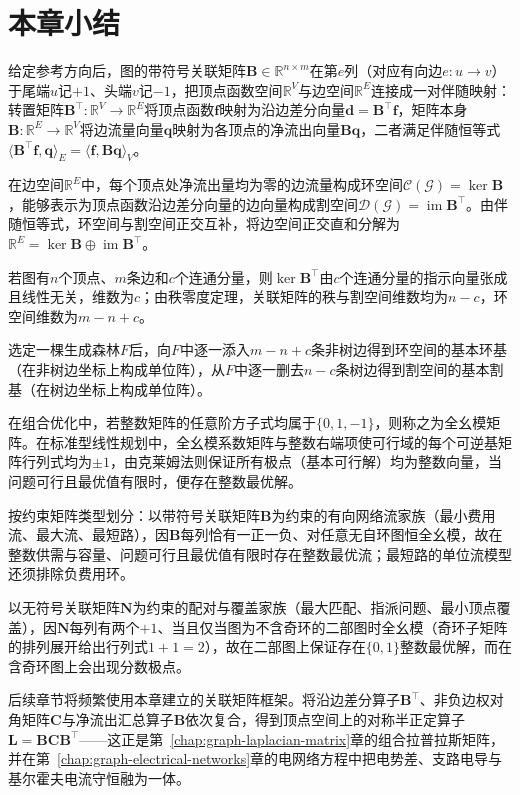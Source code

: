 \section{本章小结}
\label{sec:graph-incidence-summary}

给定参考方向后，图的带符号关联矩阵$\bm{B}\in\mathbb{R}^{n\times m}$在第$e$列（对应有向边$e\colon u\to v$）于尾端$u$记$+1$、头端$v$记$-1$，把顶点函数空间$\mathbb{R}^V$与边空间$\mathbb{R}^E$连接成一对伴随映射：转置矩阵$\bm{B}^\top\colon\mathbb{R}^V\to\mathbb{R}^E$将顶点函数$\bm{f}$映射为沿边差分向量$\bm{d}=\bm{B}^\top\bm{f}$，矩阵本身$\bm{B}\colon\mathbb{R}^E\to\mathbb{R}^V$将边流量向量$\bm{q}$映射为各顶点的净流出向量$\bm{B}\bm{q}$，二者满足伴随恒等式$\langle\bm{B}^\top\bm{f},\bm{q}\rangle_E=\langle\bm{f},\bm{B}\bm{q}\rangle_V$。

在边空间$\mathbb{R}^E$中，每个顶点处净流出量均为零的边流量构成环空间$\mathcal{C}(\mathcal{G})=\ker\bm{B}$，能够表示为顶点函数沿边差分向量的边向量构成割空间$\mathcal{D}(\mathcal{G})=\operatorname{im}\bm{B}^\top$。由伴随恒等式，环空间与割空间正交互补，将边空间正交直和分解为$\mathbb{R}^E=\ker\bm{B}\oplus\operatorname{im}\bm{B}^\top$。

若图有$n$个顶点、$m$条边和$c$个连通分量，则$\ker\bm{B}^\top$由$c$个连通分量的指示向量张成且线性无关，维数为$c$；由秩零度定理，关联矩阵的秩与割空间维数均为$n-c$，环空间维数为$m-n+c$。

选定一棵生成森林$F$后，向$F$中逐一添入$m-n+c$条非树边得到环空间的基本环基（在非树边坐标上构成单位阵），从$F$中逐一删去$n-c$条树边得到割空间的基本割基（在树边坐标上构成单位阵）。

在组合优化中，若整数矩阵的任意阶方子式均属于$\{0,1,-1\}$，则称之为全幺模矩阵。在标准型线性规划中，全幺模系数矩阵与整数右端项使可行域的每个可逆基矩阵行列式均为$\pm1$，由克莱姆法则保证所有极点（基本可行解）均为整数向量，当问题可行且最优值有限时，便存在整数最优解。

按约束矩阵类型划分：以带符号关联矩阵$\bm{B}$为约束的有向网络流家族（最小费用流、最大流、最短路），因$\bm{B}$每列恰有一正一负、对任意无自环图恒全幺模，故在整数供需与容量、问题可行且最优值有限时存在整数最优流；最短路的单位流模型还须排除负费用环。

以无符号关联矩阵$\bm{N}$为约束的配对与覆盖家族（最大匹配、指派问题、最小顶点覆盖），因$\bm{N}$每列有两个$+1$、当且仅当图为不含奇环的二部图时全幺模（奇环子矩阵的排列展开给出行列式$1+1=2$），故在二部图上保证存在$\{0,1\}$整数最优解，而在含奇环图上会出现分数极点。

后续章节将频繁使用本章建立的关联矩阵框架。将沿边差分算子$\bm{B}^\top$、非负边权对角矩阵$\bm{C}$与净流出汇总算子$\bm{B}$依次复合，得到顶点空间上的对称半正定算子$\bm{L}=\bm{B}\bm{C}\bm{B}^\top$——这正是第~\ref{chap:graph-laplacian-matrix}章的组合拉普拉斯矩阵，并在第~\ref{chap:graph-electrical-networks}章的电网络方程中把电势差、支路电导与基尔霍夫电流守恒融为一体。
